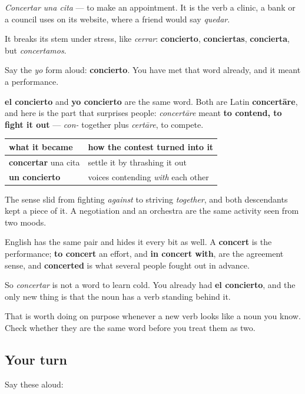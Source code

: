 \emph{Concertar una cita} — to make an appointment. It is the verb a clinic, a bank or a council uses on its website, where a friend would say \emph{quedar}.

It breaks its stem under stress, like \emph{cerrar}: \textbf{concierto}, \textbf{conciertas}, \textbf{concierta}, but \emph{concertamos}.

\begin{cousinweb}
Say the \emph{yo} form aloud: \textbf{concierto}. You have met that word already, and it meant a performance.

\textbf{el concierto} and \textbf{yo concierto} are the same word. Both are Latin \textbf{concertāre}, and here is the part that surprises people: \emph{concertāre} meant \textbf{to contend, to fight it out} — \emph{con-} together plus \emph{certāre}, to compete.

\noindent
\begin{tabularx}{\linewidth}{@{}>{\raggedright\arraybackslash}X>{\raggedright\arraybackslash}X@{}}
\toprule
\textbf{what it became} & \textbf{how the contest turned into it} \\
\midrule
\textbf{concertar} una cita & settle it by thrashing it out \\
\textbf{un concierto} & voices contending \emph{with} each other \\
\bottomrule
\end{tabularx}

The sense slid from fighting \emph{against} to striving \emph{together}, and both descendants kept a piece of it. A negotiation and an orchestra are the same activity seen from two moods.
\end{cousinweb}

\begin{culture}
English has the same pair and hides it every bit as well. A \textbf{concert} is the performance; \textbf{to concert} an effort, and \textbf{in concert with}, are the agreement sense, and \textbf{concerted} is what several people fought out in advance.

So \emph{concertar} is not a word to learn cold. You already had \textbf{el concierto}, and the only new thing is that the noun has a verb standing behind it.

That is worth doing on purpose whenever a new verb looks like a noun you know. Check whether they are the same word before you treat them as two.
\end{culture}

\subsection*{Your turn}
Say these aloud:

